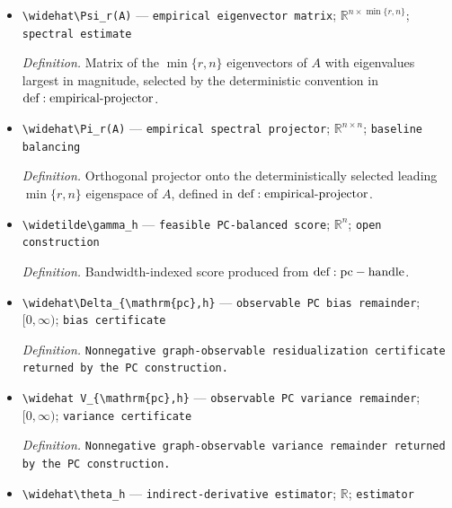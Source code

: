 \documentclass{article}
\begin{document}
\begin{itemize}
  \item \texttt{\textbackslash{}\allowbreak{}widehat\textbackslash{}\allowbreak{}Psi\_\allowbreak{}r(A)} --- \texttt{empirical eigenvector matrix}; \(\mathbb R^{n\times\min\{r,n\}}\); \texttt{spectral estimate}
  \par\smallskip\noindent\emph{Definition.} Matrix of the \(\min\{r,n\}\) eigenvectors of \(A\) with eigenvalues largest in magnitude, selected by the deterministic convention in \({\rm def:empirical\text{-}projector}\).
  \item \texttt{\textbackslash{}\allowbreak{}widehat\textbackslash{}\allowbreak{}Pi\_\allowbreak{}r(A)} --- \texttt{empirical spectral projector}; \(\mathbb R^{n\times n}\); \texttt{baseline balancing}
  \par\smallskip\noindent\emph{Definition.} Orthogonal projector onto the deterministically selected leading \(\min\{r,n\}\) eigenspace of \(A\), defined in \({\rm def:empirical\text{-}projector}\).
  \item \texttt{\textbackslash{}\allowbreak{}widetilde\textbackslash{}\allowbreak{}gamma\_\allowbreak{}h} --- \texttt{feasible PC-\allowbreak{}balanced score}; \(\mathbb R^n\); \texttt{open construction}
  \par\smallskip\noindent\emph{Definition.} Bandwidth-indexed score produced from \({\rm def:pc-handle}\).
  \item \texttt{\textbackslash{}\allowbreak{}widehat\textbackslash{}\allowbreak{}Delta\_\allowbreak{}\{\textbackslash{}\allowbreak{}mathrm\{pc\}\allowbreak{},\allowbreak{}h\}\allowbreak{}} --- \texttt{observable PC bias remainder}; \([0,\infty)\); \texttt{bias certificate}
  \par\smallskip\noindent\emph{Definition.} \texttt{Nonnegative graph-\allowbreak{}observable residualization certificate returned by the PC construction.}
  \item \texttt{\textbackslash{}\allowbreak{}widehat V\_\allowbreak{}\{\textbackslash{}\allowbreak{}mathrm\{pc\}\allowbreak{},\allowbreak{}h\}\allowbreak{}} --- \texttt{observable PC variance remainder}; \([0,\infty)\); \texttt{variance certificate}
  \par\smallskip\noindent\emph{Definition.} \texttt{Nonnegative graph-\allowbreak{}observable variance remainder returned by the PC construction.}
  \item \texttt{\textbackslash{}\allowbreak{}widehat\textbackslash{}\allowbreak{}theta\_\allowbreak{}h} --- \texttt{indirect-\allowbreak{}derivative estimator}; \(\mathbb R\); \texttt{estimator}

\end{itemize}
\end{document}
